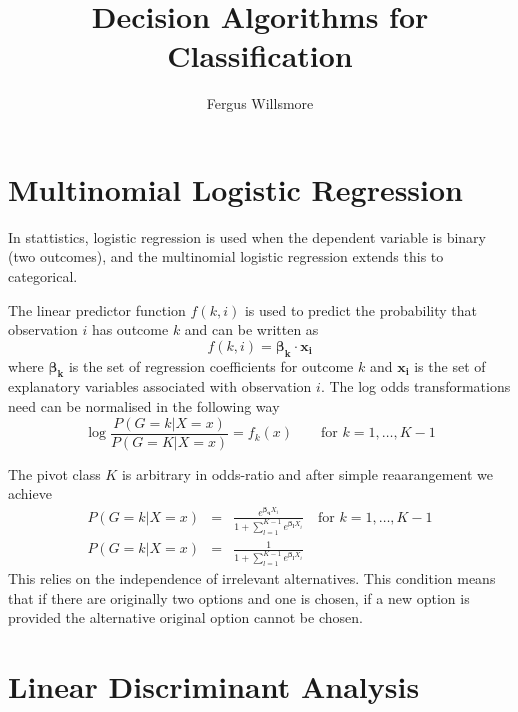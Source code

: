 \documentclass[11pt]{article}
\title{Decision Algorithms for Classification}
\author{Fergus Willsmore}
\begin{document}
\maketitle



\section*{Multinomial Logistic Regression}

In stattistics, logistic regression is used when the dependent variable is binary (two outcomes), and the multinomial logistic regression extends this to categorical.

The linear predictor function $f(k,i)$ is used to predict the probability that observation $i$ has outcome $k$ and can be written as
\begin{equation}\nonumber
f(k,i)=\bm{\beta_k}\cdot \bm{x_i}
\end{equation}  
where $\bm{\beta_k}$ is the set of regression coefficients for outcome $k$ and $\bm{x_i}$ is the set of explanatory variables associated with observation $i$. The log odds transformations need can be normalised in the following way
\begin{equation}
\log \frac{P(G=k|X=x)}{P(G=K|X=x)}=f_k(x) \qquad \text{for }k=1,\dots,K-1
\end{equation}

The pivot class $K$ is arbitrary in odds-ratio and after simple reaarangement we achieve
\begin{eqnarray*}
P(G=k|X=x)&=&\frac{e^{\bm{\beta_q}{X_i}}}{1+\sum_{l=1}^{K-1}e^{\bm{\beta_l}{X_i}}} \quad \text{for } k=1,\dots,K-1\\
P(G=k|X=x)&=&\frac{1}{1+\sum_{l=1}^{K-1}e^{\bm{\beta_l}{X_i}}}
\end{eqnarray*}
This relies on the independence of irrelevant alternatives. This condition means that if there are originally two options and one is chosen, if a new option is provided the alternative original option cannot be chosen.  
 
\section*{Linear Discriminant Analysis}
\end{document}
